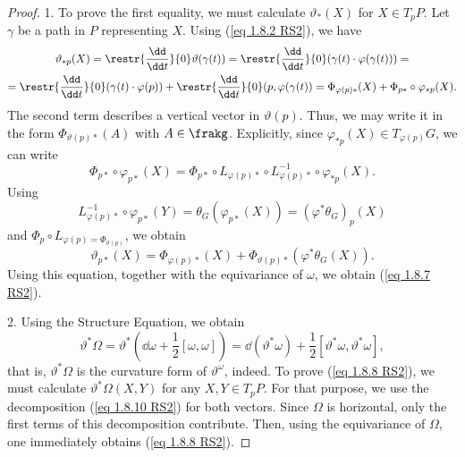 \begin{proof}
    1. To prove the first equality, we must calculate $\vartheta_\ast(X)$ for $X\in T_pP$. Let $\gamma$ be a path in $P$ representing $X$.  Using (\ref{eq 1.8.2 RS2}), we have
    \begin{multline}
        \vartheta_{\ast p}(X)=\restr{\frac{\dd}{\dd t}}{0}\vartheta(\gamma(t))=\restr{\frac{\dd}{\dd t}}{0} (\gamma(t)\cdot \varphi(\gamma(t)))=
        \\=\restr{\frac{\dd}{\dd t}}{0}(\gamma(t)\cdot \varphi(p))+\restr{\frac{\dd}{\dd t}}{0}(p,\varphi(\gamma(t))=\Phi_{\varphi(p)\ast}(X)+\Phi_{p\ast}\circ \varphi_{\ast p}(X).
    \end{multline}
    The second term describes a vertical vector in $\vartheta(p)$. Thus, we may write it in the form $\Phi_{\vartheta(p)\ast}(A)$ with $A\in\frakg$. Explicitly, since $\varphi_{\ast p}(X)\in T_{\varphi(p)}G$, we can write
    \[\Phi_{p\ast}\circ \varphi_{p\ast }(X)=\Phi_{p\ast}\circ L_{\varphi(p)\ast}\circ L_{\varphi(p)\ast}^{-1}\circ \varphi_{\ast p}(X).\]
    Using
    \[L_{\varphi(p)\ast}^{-1}\circ \varphi_{p\ast}(Y)=\theta_G(\varphi_{p\ast}(X))=(\varphi^\ast\theta_G)_p(X)\]
    and $\Phi_p\circ L_{\varphi(p)=\Phi_{\vartheta(p)}}$, we obtain
    \[\vartheta_{p\ast}(X)=\Phi_{\varphi(p)\ast}(X)+\Phi_{\vartheta(p)\ast}(\varphi^\ast\theta_G(X)).\label{eq 1.8.10 RS2}\]
    Using this equation, together with the equivariance of $\omega$, we obtain (\ref{eq 1.8.7 RS2}).

    2. Using the Structure Equation, we obtain
    \[\vartheta^\ast\Omega=\vartheta^\ast\left(\dd \omega+\frac12[\omega,\omega]\right)=\dd(\vartheta^\ast\omega)+\frac12[\vartheta^\ast\omega,\vartheta^\ast\omega],\]
    that is, $\vartheta^\ast\Omega$ is the curvature form of $\vartheta^\omega$, indeed. To prove (\ref{eq 1.8.8 RS2}), we must calculate $\vartheta^\ast \Omega(X,Y)$ for any $X,Y\in T_pP$. For that purpose, we use the decomposition (\ref{eq 1.8.10 RS2}) for both vectors. Since $\Omega$ is horizontal, only the first terms of this decomposition contribute. Then, using the equivariance of $\Omega$, one immediately obtains (\ref{eq 1.8.8 RS2}).
\end{proof}

